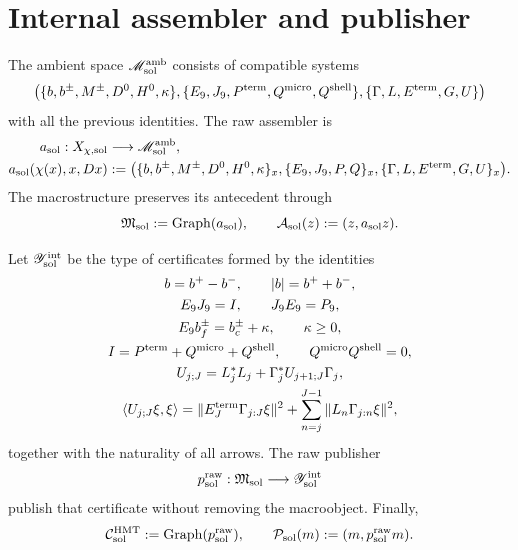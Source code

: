 \section{Internal assembler and publisher}
\label{sec:pdfv2-sol-assembler-publisher}

The ambient space \(\mathscr M_{\rm sol}^{\rm amb}\) consists of compatible
systems
\[
 \bigl(
 \{b,b^\pm,M^\pm,D^0,H^0,\kappa\},
 \{E_9,J_9,P^{\rm term},Q^{\rm micro},Q^{\rm shell}\},
 \{\Gamma,L,E^{\rm term},G,U\}
 \bigr)
\]
with all the previous identities. The raw assembler is
\begin{equation}\label{eq:pdfv2-sol-assembler}
 \begin{aligned}
 a_{\rm sol}:X_{\chi,{\rm sol}}&\longrightarrow
 \mathscr M_{\rm sol}^{\rm amb},\\
 a_{\rm sol}(\chi(x),x,Dx)&:=
 \bigl(
 \{b,b^\pm,M^\pm,D^0,H^0,\kappa\}_x,
 \{E_9,J_9,P,Q\}_x,
 \{\Gamma,L,E^{\rm term},G,U\}_x
 \bigr).
 \end{aligned}
\end{equation}
The macrostructure preserves its antecedent through
\begin{equation}\label{eq:pdfv2-sol-macro-graph}
 \mathfrak M_{\rm sol}:=\operatorname{Graph}(a_{\rm sol}),
 \qquad
 \mathcal A_{\rm sol}(z):=(z,a_{\rm sol}z).
\end{equation}

Let \(\mathscr Y_{\rm sol}^{\rm int}\) be the type of certificates formed by
the identities
\begin{equation}\label{eq:pdfv2-sol-certificate-list}
 \begin{gathered}
 b=b^+-b^-,\qquad |b|=b^++b^-,\\
 E_9J_9=I,\qquad J_9E_9=P_9,\\
 E_9b_f^\pm=b_c^\pm+\kappa,\qquad\kappa\geq0,\\
 I=P^{\rm term}+Q^{\rm micro}+Q^{\rm shell},
 \qquad Q^{\rm micro}Q^{\rm shell}=0,\\
 U_{j;J}=L_j^*L_j+\Gamma_j^*U_{j+1;J}\Gamma_j,\\
 \langle U_{j;J}\xi,\xi\rangle
 =\|E_J^{\rm term}\Gamma_{j:J}\xi\|^2
  +\sum_{n=j}^{J-1}\|L_n\Gamma_{j:n}\xi\|^2,
 \end{gathered}
\end{equation}
together with the naturality of all arrows. The raw publisher
\begin{equation}\label{eq:pdfv2-sol-publisher}
 p_{\rm sol}^{\rm raw}:\mathfrak M_{\rm sol}
 \longrightarrow\mathscr Y_{\rm sol}^{\rm int}
\end{equation}
publish that certificate without removing the macroobject. Finally,
\begin{equation}\label{eq:pdfv2-sol-output-graph}
 \mathcal C_{\rm sol}^{\rm HMT}
 :=\operatorname{Graph}(p_{\rm sol}^{\rm raw}),
 \qquad
 \mathcal P_{\rm sol}(m):=(m,p_{\rm sol}^{\rm raw}m).
\end{equation}

